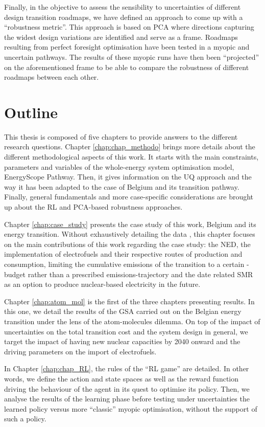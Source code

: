Finally, in the objective to assess the sensibility to uncertainties of different design transition roadmaps, we have defined an approach to come up with a ``robustness metric''. This approach is based on \gls{PCA} where directions capturing the widest design variations are identified and serve as a frame. Roadmaps resulting from perfect foresight optimisation have been tested in a myopic and uncertain pathways. The results of these myopic runs have then been ``projected'' on the aforementioned frame to be able to compare the robustness of different roadmaps between each other.

\section*{Outline}
This thesis is composed of five chapters to provide answers to the different research questions. Chapter \ref{chap:chap_methodo} brings more details about the different methodological aspects of this work. It starts with the main constraints, parameters and variables of the whole-energy system optimisation model, EnergyScope Pathway. Then, it gives information on the \gls{UQ} approach and the way it has been adapted to the case of Belgium and its transition pathway. Finally, general fundamentals and more case-specific considerations are brought up about the \gls{RL} and \gls{PCA}-based robustness approaches.

Chapter \ref{chap:case_study} presents the case study of this work, \ie Belgium and its energy transition. Without exhaustively detailing the data \cite{limpens2021generating}, this chapter focuses on the main contributions of this work regarding the case study: the \gls{NED}, the implementation of electrofuels and their respective routes of production and consumption, limiting  the cumulative emissions of the transition to a certain -budget rather than a prescribed emissions-trajectory and the date related \gls{SMR} as an option to produce nuclear-based electricity in the future.

Chapter \ref{chap:atom_mol} is the first of the three chapters presenting results. In this one, we detail the results of the \gls{GSA} carried out on the Belgian energy transition under the lens of the atom-molecules dilemma. On top of the impact of uncertainties on the total transition cost and the system design in general, we target the impact of having new nuclear capacities by 2040 onward and the driving parameters on the import of electrofuels.

In Chapter \ref{chap:chap_RL}, the rules of the ``\gls{RL} game'' are detailed. In other words, we define the action and state spaces as well as the reward function driving the behaviour of the agent in its quest to optimise its policy. Then, we analyse the results of the learning phase before testing under uncertainties the learned policy versus more ``classic'' myopic optimisation, \ie without the support of such a policy.

